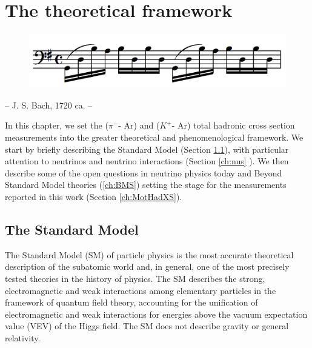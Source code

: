 
\chapter{The theoretical framework}\label{ch:TheTheory}

\begin{figure}[h!]
\includegraphics[scale=0.2,right]{Chapter-1/Images/Bach.png}
\end{figure}

{\raggedleft -- J. S. Bach, 1720 ca. -- \par} %
\vspace{0.5cm}

In this chapter, we set the ($\pi^-$- Ar) and ($K^+$- Ar) total hadronic cross section measurements into the greater theoretical and phenomenological framework. We start by briefly describing the Standard Model (Section \ref{ch:SM}), with particular attention to neutrinos and neutrino interactions (Section \ref{ch:nus} ). We then describe some of the open questions in neutrino physics today and Beyond Standard Model theories (\ref{ch:BMS}) setting the stage for the measurements reported in this work (Section \ref{ch:MotHadXS}).

\section{The Standard Model}\label{ch:SM}
The Standard Model (SM) of particle physics is the most accurate theoretical description of the subatomic world and, in general, one of the most precisely tested theories in the history of physics.  The SM describes the strong, electromagnetic and weak interactions among  elementary particles in the framework of quantum field theory, accounting for the unification of electromagnetic and weak interactions for energies above the  vacuum expectation value (VEV) of the Higgs field. The SM does not describe gravity or general relativity.

